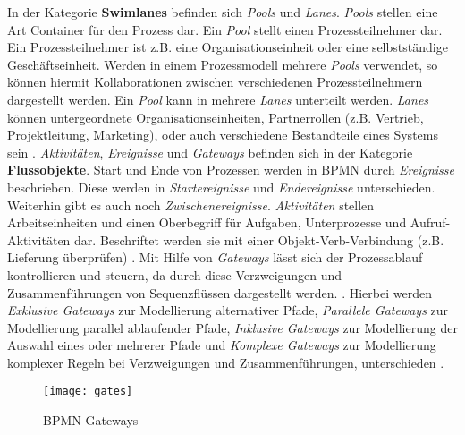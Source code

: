 In der Kategorie \textbf{Swimlanes} befinden sich \textit{Pools} und \textit{Lanes}. \textit{Pools} stellen eine Art Container für den Prozess dar. Ein \textit{Pool} stellt einen Prozessteilnehmer dar. Ein Prozessteilnehmer ist z.B. eine Organisationseinheit oder eine selbstständige Geschäftseinheit. Werden in einem Prozessmodell mehrere \textit{Pools} verwendet, so können hiermit Kollaborationen zwischen verschiedenen Prozessteilnehmern dargestellt werden. Ein \textit{Pool} kann in mehrere \textit{Lanes} unterteilt werden. \textit{Lanes} können untergeordnete Organisationseinheiten, Partnerrollen (z.B. Vertrieb, Projektleitung, Marketing), oder auch verschiedene Bestandteile eines Systems sein \cite{gpfert2012, pitschke2010, allweyer2013}. \newline
\textit{Aktivitäten}, \textit{Ereignisse} und \textit{Gateways} befinden sich in der Kategorie \textbf{Flussobjekte}.
Start und Ende von Prozessen werden in BPMN durch \textit{Ereignisse} beschrieben. Diese werden in  \textit{Startereignisse} und \textit{Endereignisse} unterschieden.  Weiterhin gibt es auch noch \textit{Zwischenereignisse}. \newline
\textit{Aktivitäten} stellen Arbeitseinheiten und einen Oberbegriff für Aufgaben, Unterprozesse und Aufruf-Aktivitäten dar. Beschriftet werden sie mit einer Objekt-Verb-Verbindung (z.B. Lieferung überprüfen) \cite{gpfert2012}. \newline
Mit Hilfe von \textit{Gateways} lässt sich der Prozessablauf kontrollieren und steuern, da durch diese Verzweigungen und Zusammenführungen von Sequenzflüssen dargestellt werden. \cite{gpfert2012, allweyer2013}. Hierbei werden \textit{Exklusive Gateways} zur Modellierung alternativer Pfade, \textit{Parallele Gateways} zur Modellierung parallel ablaufender Pfade, \textit{Inklusive Gateways} zur Modellierung der Auswahl eines oder mehrerer Pfade und \textit{Komplexe Gateways} zur Modellierung komplexer Regeln bei Verzweigungen und Zusammenführungen, unterschieden \cite{allweyer2013}.\newline 

\begin{figure}[H]
\begin{center}
  \texttt{[image: gates]} %
  \caption{BPMN-Gateways}
  \label{fig:gates}
\end{center}
\end{figure} 


